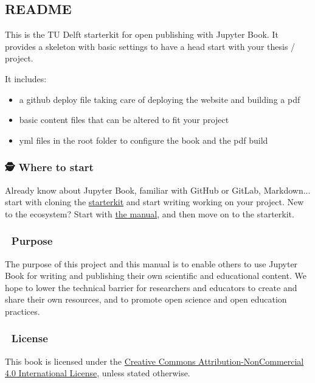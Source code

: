 \subsection{README}

This is the TU Delft starterkit for open publishing with Jupyter Book. It provides a skeleton with basic settings to have a head start with your thesis / project.

It includes:

\begin{itemize}
\item a github deploy file taking care of deploying the website and building a pdf
\item basic content files that can be altered to fit your project
\item yml files in the root folder to configure the book and the pdf build
\end{itemize}

\subsubsection{🕵 Where to start}

Already know about Jupyter Book, familiar with GitHub or GitLab, Markdown... start with cloning the \href{https://github.com/new?template\_name=starterkit\&template\_owner=TUD-JB-OS}{starterkit} and start writing working on your project. New to the ecosystem? Start with \href{https://tud-jb-os.github.io/book}{the manual}, and then move on to the starterkit.

\subsubsection{🏁 Purpose}

The purpose of this project and this manual is to enable others to use Jupyter Book for writing and publishing their own scientific and educational content. We hope to lower the technical barrier for researchers and educators to create and share their own resources, and to promote open science and open education practices.

\subsubsection{📄 License}

This book is licensed under the \href{http://creativecommons.org/licenses/by-nc/4.0/}{Creative Commons Attribution-NonCommercial 4.0 International License}, unless stated otherwise.

